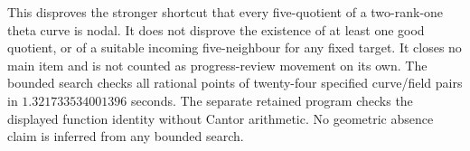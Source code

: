 \begin{remark}
\label{rem:root-f1-bad-five-kernel-scope}
This disproves the stronger shortcut that every five-quotient of
a two-rank-one theta curve is nodal. It does not disprove the
existence of at least one good quotient, or of a suitable incoming
five-neighbour for any fixed target. It closes no main item and
is not counted as progress-review movement on its own.
The bounded search  checks all
rational points of twenty-four specified curve/field pairs in
$1.321733534001396$ seconds. The separate retained program
checks the displayed function identity without Cantor arithmetic.
No geometric absence claim is inferred from any bounded search.
\end{remark}
